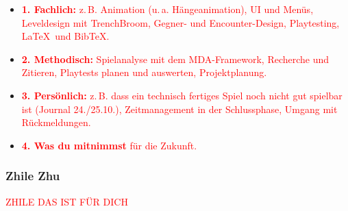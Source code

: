 \documentclass[../Main.tex]{subfiles}
\begin{document}
\begin{itemize}[leftmargin=1.5cm]
    \item \textcolor{red}{\textbf{1. Fachlich:} z.\,B. Animation (u.\,a. Hängeanimation), UI und Menüs, Leveldesign mit TrenchBroom, Gegner- und Encounter-Design, Playtesting, \LaTeX\ und BibTeX.}
    \item \textcolor{red}{\textbf{2. Methodisch:} Spielanalyse mit dem MDA-Framework, Recherche und Zitieren, Playtests planen und auswerten, Projektplanung.}
    \item \textcolor{red}{\textbf{3. Persönlich:} z.\,B. dass ein technisch fertiges Spiel noch nicht gut spielbar ist (Journal 24./25.10.), Zeitmanagement in der Schlussphase, Umgang mit Rückmeldungen.}
    \item \textcolor{red}{\textbf{4. Was du mitnimmst} für die Zukunft.}
\end{itemize}

\subsubsection{Zhile Zhu}

\textcolor{red}{ZHILE DAS IST FÜR DICH}
\end{document}
